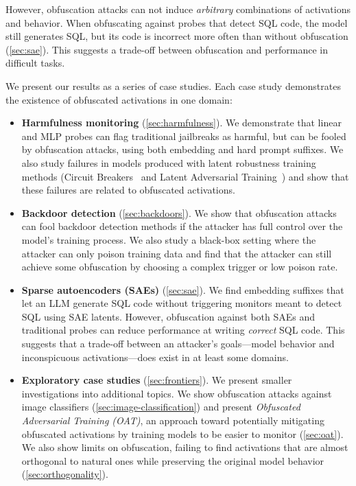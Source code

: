 \documentclass{article}
\begin{document}
However, obfuscation attacks can not induce \emph{arbitrary} combinations of activations and behavior. When obfuscating against probes that detect SQL code, the model still generates SQL, but its code is incorrect more often than without obfuscation (\cref{sec:sae}). This suggests a trade-off between obfuscation and performance in difficult tasks.

We present our results as a series of case studies. Each case study
demonstrates the existence of obfuscated activations in one domain:
\begin{itemize}
    \item \textbf{Harmfulness monitoring} (\cref{sec:harmfulness}). We demonstrate that linear and MLP probes can flag traditional jailbreaks as harmful, but can be fooled by obfuscation attacks, using both embedding and hard prompt suffixes. We also study failures in models produced with latent robustness training methods (Circuit Breakers~\citep{zou2024improving} and Latent Adversarial Training~\citep{sheshadri2024targeted}) and show that 
    these failures are related to obfuscated activations.
    \item \textbf{Backdoor detection} (\cref{sec:backdoors}). We show that obfuscation attacks can fool backdoor detection methods if the attacker has full control over the model's training process. We also study a black-box setting where the attacker can only poison training data and find that the attacker can still achieve some obfuscation by choosing a complex trigger or low poison rate. 
    \item \textbf{Sparse autoencoders (SAEs)} (\cref{sec:sae}). We find embedding suffixes that let an LLM generate SQL code without triggering monitors meant to detect SQL using SAE latents. However, obfuscation against both SAEs and traditional probes can reduce performance at writing \emph{correct} SQL code. This suggests that a trade-off between an attacker's goals---model behavior and inconspicuous activations---does exist in at least some domains. 
    \item \textbf{Exploratory case studies} (\cref{sec:frontiers}).
    We present smaller investigations into additional topics. We show obfuscation attacks against image classifiers
    (\cref{sec:image-classification}) and present \emph{Obfuscated Adversarial Training (OAT)}, an approach toward potentially mitigating obfuscated activations by training models to be easier to monitor (\cref{sec:oat}). We also show limits on obfuscation, failing to find activations that are almost orthogonal to natural ones while preserving the original model behavior (\cref{sec:orthogonality}).
\end{itemize}
\end{document}
